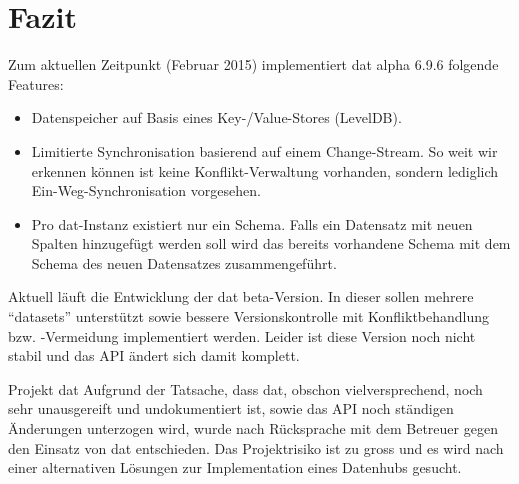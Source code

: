 \chapter{Fazit}
Zum aktuellen Zeitpunkt (Februar 2015) implementiert dat alpha 6.9.6 folgende Features:
\begin{itemize}
\item Datenspeicher auf Basis eines Key-/Value-Stores (LevelDB).
\item Limitierte Synchronisation basierend auf einem Change-Stream. So weit wir erkennen können ist keine Konflikt-Verwaltung vorhanden, sondern lediglich Ein-Weg-Synchronisation vorgesehen.
\item Pro dat-Instanz existiert nur ein Schema. Falls ein Datensatz mit neuen Spalten hinzugefügt werden soll wird das bereits vorhandene Schema mit dem Schema des neuen Datensatzes zusammengeführt.
\end{itemize}

Aktuell läuft die Entwicklung der dat beta-Version. In dieser sollen mehrere ``datasets'' unterstützt sowie bessere Versionskontrolle mit Konfliktbehandlung bzw. -Vermeidung implementiert werden. Leider ist diese Version noch nicht stabil und das API ändert sich damit komplett.

\begin{decision}[label=dec:dat:fazit]{Projekt dat}
Aufgrund der Tatsache, dass \gls{dat}, obschon vielversprechend, noch sehr unausgereift und undokumentiert ist, sowie das API noch ständigen Änderungen unterzogen wird, wurde nach Rücksprache mit dem Betreuer gegen den Einsatz von \gls{dat} entschieden. Das Projektrisiko ist zu gross und es wird nach einer alternativen Lösungen zur Implementation eines Datenhubs gesucht.
\end{decision}

